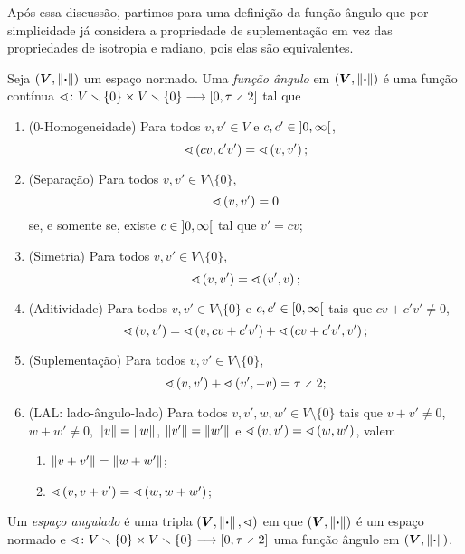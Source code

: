 Após essa discussão, partimos para uma definição da função ângulo que por simplicidade já considera a propriedade de suplementação em vez das propriedades de isotropia e radiano, pois elas são equivalentes.
\clearpage
\begin{definition}
Seja $(\bm V, \left\Vert{\bm{\cdot}}\right\Vert)$ um espaço normado. Uma \emph{função ângulo} em $(\bm V, \left\Vert{\bm{\cdot}}\right\Vert)$ é uma função contínua $\fun{\angf}{V \setminus \{0\} \times V \setminus \{0\}}{\intff{0}{\tau \div 2}}$ tal que
	\begin{enumerate}
		\item ($0$-Homogeneidade) Para todos $v,v' \in V$ e $c,c' \in \left]{0},{\infty}\right[$,
			\begin{equation*}
				\sphericalangle\left({cv},{c'v'}\right) = \sphericalangle\left({v},{v'}\right);
			\end{equation*}
		\item (Separação) Para todos $v,v' \in V \setminus \{0\}$,
			\begin{equation*}
				\sphericalangle\left({v},{v'}\right) = 0
			\end{equation*}
		se, e somente se, existe $c \in \left]{0},{\infty}\right[$ tal que $v'=cv$;
		\item (Simetria) Para todos $v,v' \in V \setminus \{0\}$,
			\begin{equation*}
				\sphericalangle\left({v},{v'}\right) = \sphericalangle\left({v'},{v}\right);
			\end{equation*}
		\item (Aditividade) Para todos $v,v' \in V \setminus \{0\}$ e $c,c' \in \left[{0},{\infty}\right[$ tais que $cv+c'v' \neq 0$,
			\begin{equation*}
				\sphericalangle\left({v},{v'}\right) = \sphericalangle\left({v},{cv+c'v'}\right) + \sphericalangle\left({cv+c'v'},{v'}\right);
			\end{equation*}
		\item (Suplementação) Para todos $v,v' \in V \setminus \{0\}$,
			\begin{equation*}
				\ang{v}{v'} + \ang{v'}{-v} = \tau \div 2;
			\end{equation*}
		\item (LAL: lado-ângulo-lado) Para todos $v,v',w,w' \in V \setminus \{0\}$ tais que $v+v' \neq 0$, $w+w' \neq 0$, $\left\Vert{v}\right\Vert=\left\Vert{w}\right\Vert$, $\left\Vert{v'}\right\Vert=\left\Vert{w'}\right\Vert$ e $\sphericalangle\left({v},{v'}\right)=\sphericalangle\left({w},{w'}\right)$, valem
			\begin{enumerate}
			\item $\left\Vert{v+v'}\right\Vert=\left\Vert{w+w'}\right\Vert$;
			\item $\sphericalangle\left({v},{v+v'}\right)=\sphericalangle\left({w},{w+w'}\right)$;
			\end{enumerate}
	\end{enumerate}
Um \emph{espaço angulado} é uma tripla $(\bm V, \left\Vert{\bm{\cdot}}\right\Vert,\sphericalangle)$ em que $(\bm V, \left\Vert{\bm{\cdot}}\right\Vert)$ é um espaço normado e $\fun{\angf}{V \setminus \{0\} \times V \setminus \{0\}}{\intff{0}{\tau \div 2}}$ uma função ângulo em $(\bm V, \left\Vert{\bm{\cdot}}\right\Vert)$.
\end{definition}

